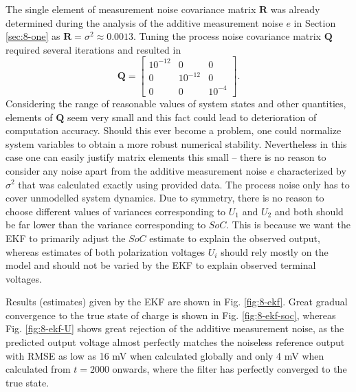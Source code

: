 The single element of measurement noise covariance matrix $\mathbf{R}$ was already determined during the analysis of the additive measurement noise $e$ in Section \ref{sec:8-one} as $\mathbf{R} = \sigma^2 \approx 0.0013$. Tuning the process noise covariance matrix $\mathbf{Q}$ required several iterations and resulted in
\begin{equation}
    \mathbf{Q} = \begin{bmatrix}
    10^{-12} & 0 & 0 \\ 0 & 10^{-12} & 0 \\ 0 & 0 & 10^{-4}
\end{bmatrix}.
\end{equation}
Considering the range of reasonable values of system states and other quantities, elements of $\mathbf{Q}$ seem very small and this fact could lead to deterioration of computation accuracy. Should this ever become a problem, one could normalize system variables to obtain a more robust numerical stability. Nevertheless in this case one can easily justify matrix elements this small -- there is no reason to consider any noise apart from the additive measurement noise $e$ characterized by $\sigma^2$ that was calculated exactly using provided data. The process noise only has to cover unmodelled system dynamics. Due to symmetry, there is no reason to choose different values of variances corresponding to $U_1$ and $U_2$ and both should be far lower than the variance corresponding to $SoC$. This is because we want the EKF to primarily adjust the $SoC$ estimate to explain the observed output, whereas estimates of both polarization voltages $U_{i}$ should rely mostly on the model and should not be varied by the EKF to explain observed terminal voltages.

Results (estimates) given by the EKF are shown in Fig. \ref{fig:8-ekf}. Great gradual convergence to the true state of charge is shown in Fig. \ref{fig:8-ekf-soc}, whereas Fig. \ref{fig:8-ekf-U} shows great rejection of the additive measurement noise, as the predicted output voltage almost perfectly matches the noiseless reference output with RMSE as low as 16 mV when calculated globally and only 4 mV when calculated from $t = 2000$ onwards, where the filter has perfectly converged to the true state.

